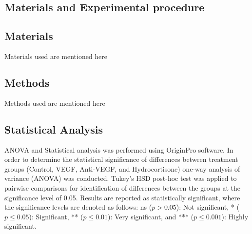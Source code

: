 \newpage
\null
\thispagestyle{empty}
\newpage
\begin{refsection}
\chapter{Materials and Experimental procedure}
\section{Materials}
\label{Materials}
Materials used are mentioned here
\section{Methods}
\label{Methods}
Methods used are mentioned here
\section{Statistical Analysis}
\label{Statistical}
ANOVA and Statistical analysis was performed using OriginPro software.
In order to determine the statistical significance of differences between treatment groups (Control, VEGF, Anti-VEGF, and Hydrocortisone) one-way analysis of variance (ANOVA) was conducted.
Tukey’s HSD post-hoc test was applied to pairwise comparisons for identification of differences between the groups at the significance level \textcolor{black}{of} 0.05.
Results are reported as statistically significant, where the significance levels are denoted as follows: ns ($p > 0.05$): Not significant, * ($p \leq 0.05$): Significant, ** ($p \leq 0.01$): Very significant, and *** ($p \leq 0.001$): Highly significant.





\printbibliography
\newpage
\null
\thispagestyle{empty}
\newpage
\end{refsection}

